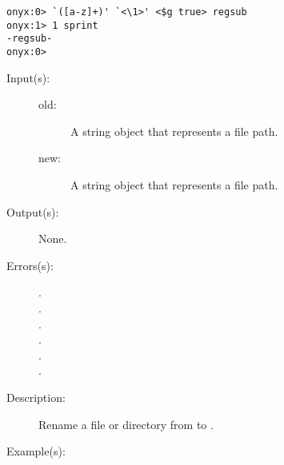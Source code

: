 \begin{description}
\begin{description}
\begin{verbatim}
onyx:0> `([a-z]+)' `<\1>' <$g true> regsub
onyx:1> 1 sprint
-regsub-
onyx:0>
		\end{verbatim}
	\end{description}
\label{systemdict:rename}
\item[{\onyxop{old new}{rename}{--}}: ]
	\begin{description}\item[]
	\item[Input(s): ]
		\begin{description}\item[]
		\item[old: ]
			A string object that represents a file path.
		\item[new: ]
			A string object that represents a file path.
		\end{description}
	\item[Output(s): ] None.
	\item[Errors(s): ]
		\begin{description}\item[]
		\item[.]
		\item[.]
		\item[.]
		\item[.]
		\item[.]
		\item[.]
		\end{description}
	\item[Description: ]
		Rename a file or directory from  to .
	\item[Example(s): ]\begin{verbatim}


\end{verbatim}
\end{description}
\end{description}
